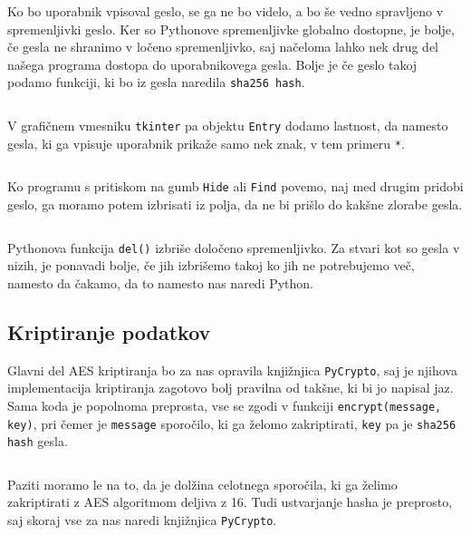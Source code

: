     \inputminted[firstline=4, lastline=5, frame=lines]{python}{latex/code_parts.py}

    Ko bo uporabnik vpisoval geslo, se ga ne bo videlo, a bo še vedno spravljeno v spremenljivki geslo. Ker so Pythonove spremenljivke globalno dostopne, je bolje, če gesla ne shranimo v ločeno spremenljivko, saj načeloma lahko nek drug del našega programa dostopa do uporabnikovega gesla. Bolje je če geslo takoj podamo funkciji, ki bo iz gesla naredila \texttt{sha256 hash}.

    \inputminted[firstline=7, lastline=7, frame=lines]{python}{latex/code_parts.py}

    V grafičnem vmesniku \texttt{tkinter} pa objektu \texttt{Entry} dodamo lastnost, da namesto gesla, ki ga vpisuje uporabnik prikaže samo nek znak, v tem primeru \texttt{*}.

    \inputminted[firstline=9, lastline=10, frame=lines]{python}{latex/code_parts.py}

    Ko programu s pritiskom na gumb \texttt{Hide} ali \texttt{Find} povemo, naj med drugim pridobi geslo, ga moramo potem izbrisati iz polja, da ne bi prišlo do kakšne zlorabe gesla.

    \inputminted[firstline=12, lastline=15, frame=lines]{python}{latex/code_parts.py}

    Pythonova funkcija \texttt{del()} izbriše določeno spremenljivko. Za stvari kot so gesla v nizih, je ponavadi bolje, če jih izbrišemo takoj ko jih ne potrebujemo več, namesto da čakamo, da to namesto nas naredi Python.


\subsection{Kriptiranje podatkov}

    Glavni del AES kriptiranja bo za nas opravila knjižnjica \texttt{PyCrypto}, saj je njihova implementacija kriptiranja zagotovo bolj pravilna od takšne, ki bi jo napisal jaz. Sama koda je popolnoma preprosta, vse se zgodi v funkciji \texttt{encrypt(message, key)}, pri čemer je \texttt{message} sporočilo, ki ga želomo zakriptirati, \texttt{key} pa je \texttt{sha256 hash} gesla.

    \inputminted[firstline=17, lastline=19, frame=lines]{python}{latex/code_parts.py}

    Paziti moramo le na to, da je dolžina celotnega sporočila, ki ga želimo zakriptirati z AES algoritmom deljiva z 16. Tudi ustvarjanje hasha je preprosto, saj skoraj vse za nas naredi knjižnjica \texttt{PyCrypto}.

